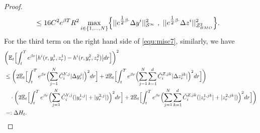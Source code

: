 \documentclass[10pt,a4paper]{article}
\theoremstyle{plain}
\theoremstyle{definition}
\numberwithin{equation}{section}
\begin{document}
\begin{proof}
\begin{align}
&\leq 16C^{2}e^{\beta T}R^{2}\max_{i \in \{1,...,N\}}\Bigl\{||e^{\tfrac{1}{2}\beta\cdot}\Delta y^{i}||_{\mathcal{S}^{\infty}}^{2} \ , \ ||e^{\tfrac{1}{2}\beta\cdot}\Delta z^{i}||_{\mathcal{Z}_{BMO}^{2}}^{2}\Bigr\}. \label{equ:misc8}
\end{align}
For the third term on the right hand side of \eqref{equ:misc7}, similarly, we have
\begin{align*}
&\biggl(\mathbb{E}_{t}\Bigl[\int_{t}^{T}e^{\beta r}\bigl|h^{i}(r,y_{r}^{1},z_{r}^{1})-h^{i}(r,y_{r}^{2},z_{r}^{2})\bigr|dr\Bigr]\biggr)^{2} \nonumber \\
&\leq \biggl(2\mathbb{E}_{t}\Bigl[\int_{t}^{T}e^{\beta r}\Bigl(\sum_{j=1}^{N}\tilde{C}_{i}^{Y,j}|\Delta y_{r}^{j}|\Bigr)^{2}dr\Bigr] + 2\mathbb{E}_{t}\Bigl[\int_{t}^{T}e^{\beta r}\Bigl(\sum_{j=1}^{N}\sum_{k=1}^{d}\tilde{C}_{i}^{Z,jk}|\Delta z_{r}^{jk}|\Bigr)^{2}dr\Bigr]\biggr)  \nonumber \\
&\ \ \ \cdot \biggl(2\mathbb{E}_{t}\Bigl[\int_{t}^{T}e^{\beta r}\Bigl(\sum_{j=1}^{N}\tilde{C}_{i}^{Y,j}(|y_{r}^{1,j}|+|y_{r}^{2,j}|)\Bigr)^{2}dr\Bigr] + 2\mathbb{E}_{t}\Bigl[\int_{t}^{T}e^{\beta r}\Bigl(\sum_{j=1}^{N}\sum_{k=1}^{d}\tilde{C}_{i}^{Z,jk}(|z_{r}^{1,jk}|+|z_{r}^{2,jk}|)\Bigr)^{2}dr\Bigr]\biggr) \\
&=:\Delta H_t. \nonumber

\end{align*}
\end{proof}
\end{document}
